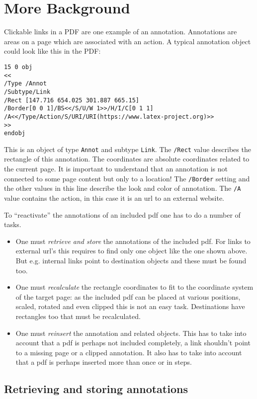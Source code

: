 \documentclass[DIV=12,parskip=half-,bibliography=totoc]{scrartcl}
\begin{document}
\section{More Background}

Clickable links in a PDF are one example of an annotation. Annotations are areas on a page which are associated with an action. A typical annotation object could look like this in the PDF:

\begin{lstlisting}
15 0 obj
<<
/Type /Annot
/Subtype/Link
/Rect [147.716 654.025 301.887 665.15]
/Border[0 0 1]/BS<</S/U/W 1>>/H/I/C[0 1 1]
/A<</Type/Action/S/URI/URI(https://www.latex-project.org)>>
>>
endobj
\end{lstlisting}
This is an object of type \texttt{Annot} and subtype \texttt{Link}.
The \texttt{/Rect} value describes the rectangle of this annotation. The coordinates are absolute coordinates related to the current page. It is important to understand that an annotation is not connected to some page content but only to a location!
The \texttt{/Border} setting and the other values in this line describe the look and color of annotation. The \texttt{/A} value contains the action, in this case it is an url to an external website.


To \enquote{reactivate} the annotations of an included pdf one has to do a number of tasks.
\begin{itemize}
\item One must \emph{retrieve and store} the annotations of the included pdf. For links to external url's this requires to find only one object like the one shown above. But e.g. internal links point to destination objects and these must be found too.
\item One must \emph{recalculate} the rectangle coordinates to fit to the coordinate system of the target page: as the included pdf can be placed at various positions, scaled, rotated and even clipped this is not an easy task. Destinations have rectangles too that must be recalculated.
\item  One must  \emph{reinsert} the annotation and related objects. This has to take into account that a pdf is perhaps not included completely, a link shouldn't point to a missing page or a clipped annotation. It also has to take into account that a pdf is perhaps inserted more than once or in steps.
\end{itemize}

\subsection{Retrieving and storing annotations}
\end{document}

